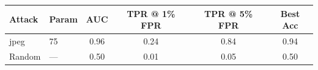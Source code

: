 \begin{tabular}{llcccc}
\toprule
Attack & Param & AUC & TPR @ 1\% FPR & TPR @ 5\% FPR & Best Acc \\
\midrule
jpeg & 75 & 0.96 & 0.24 & 0.84 & 0.94 \\
Random & — & 0.50 & 0.01 & 0.05 & 0.50 \\
\bottomrule
\end{tabular}
